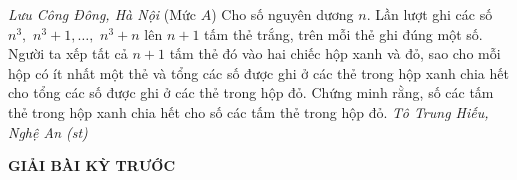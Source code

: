 \begin{multicols}{2}
\begin{figure}[H]
		\vspace*{-20pt}
	\end{figure}
	\hfill	\textit{\small Lưu Công Đông, Hà Nội}
	\vskip 0.05cm
	{}
	(Mức $A$) Cho số nguyên dương $n$. Lần lượt ghi các số $n^3,$ $n^3+1,\ldots,$ $n^3+n$ lên $n+1$ tấm thẻ trắng, trên mỗi thẻ ghi đúng một số. Người ta xếp tất cả $n+1$ tấm thẻ đó vào hai chiếc hộp xanh và đỏ, sao cho mỗi hộp có ít nhất một thẻ và  tổng các số được ghi ở các thẻ trong hộp xanh chia hết cho tổng các số được ghi ở các thẻ trong hộp đỏ. Chứng minh rằng, số các tấm thẻ trong hộp xanh chia hết cho số các tấm thẻ trong hộp đỏ.
	\vskip 0.05cm
	\hfill	\textit{\small Tô Trung Hiếu, Nghệ An (st)}
\end{multicols}
\centerline{{\large{\textbf{\color{thachthuctoanhoc}GIẢI BÀI KỲ TRƯỚC}}}}
\vspace*{-5pt}
